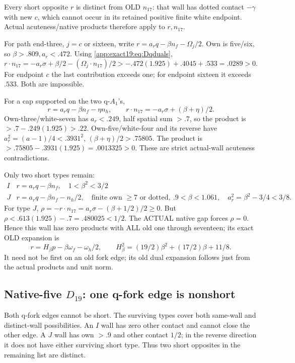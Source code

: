 \documentclass[11pt]{article}
\theoremstyle{definition}
\theoremstyle{remark}
\begin{document}
Every short opposite \(r\) is
distinct from OLD \(n_{17}\):
that wall has dotted contact
\(-\gamma\) with new \(c\), which
cannot occur in its retained
positive finite white endpoint.
Actual acuteness/native products
therefore apply to \(r,n_{17}\).

For path end-three, \(j=c\) or
sixteen, write
\(r=a_rq-\beta n_f-\Omega_j/2\).
Own is five/six, so
\(\beta>.809,a_r<.472\).
Using \eqref{app:exact19:eq:Dqduals},
\[
 r\cdot n_{17}
     =-a_r\sigma+\beta/2-(\Omega_j\cdot n_{17})/2
          >-.472(1.925)+.4045+.533=.0289>0 .
\]
For endpoint \(c\) the last
contribution exceeds one; for
endpoint sixteen it exceeds
\(.533\).
Both are impossible.

For a cap supported on the two
q-\(A_1\)'s,
\[
 r=a_rq-\beta n_f-\eta n_h,\qquad
           r\cdot n_{17}=-a_r\sigma+(\beta+\eta)/2 .
\]
Own-three/white-seven has
\(a_r<.249\), half spatial sum
\(>.7\), so the product is
\(>.7-.249(1.925)>.22\).
Own-five/white-four and its
reverse have
\(a_r^2=(a-1)/4<.3931^2\),
\((\beta+\eta)/2>.75805\).
The product is
\(>.75805-.3931(1.925)=.0013325>0\).
These are strict actual-wall
acuteness contradictions.

Only two short types remain:
\[
\begin{array}{c|c}
 I&r=a_rq-\beta n_f,\quad1<\beta^2<3/2\\
 J&r=a_rq-\beta n_f-n_h/2,\quad
      \text{finite own }\ge7\text{ or dotted},\
      .9<\beta<1.061,\quad a_r^2=\beta^2-3/4<3/8 .
\end{array}
\]
For type \(J\),
\(\rho=-r\cdot n_{17}
=a_r\sigma-(\beta+1/2)/2\ge0\).
But
\(\rho<.613(1.925)-.7=.480025<1/2\).
The ACTUAL native gap forces
\(\rho=0\).
Hence this wall has zero products
with ALL old one through seventeen;
its exact OLD expansion is
\[
 r=H_\beta p-\beta\omega_f-\omega_h/2,\qquad
                 H_\beta^2=(19/2)\beta^2+(17/2)\beta+11/8 .
\tag{D19qJ}\label{app:exact19:eq:DqJ}
\]
It need not be first on an old
fork edge; its old dual expansion
follows just from the actual
products and unit norm.

\subsection{Native-five \(D_{19}\): one q-fork edge is nonshort}
\label{app:exact19:Dfiveqnonshort}

Both q-fork edges cannot be short.
The surviving types cover both
same-wall and distinct-wall
possibilities.
An \(I\) wall has zero other
contact and cannot close the
other edge.
A \(J\) wall has own \(>.9\)
and other contact \(1/2\);
in the reverse direction it
does not have either surviving
short type.
Thus two short opposites in
the remaining list are distinct.
\end{document}
